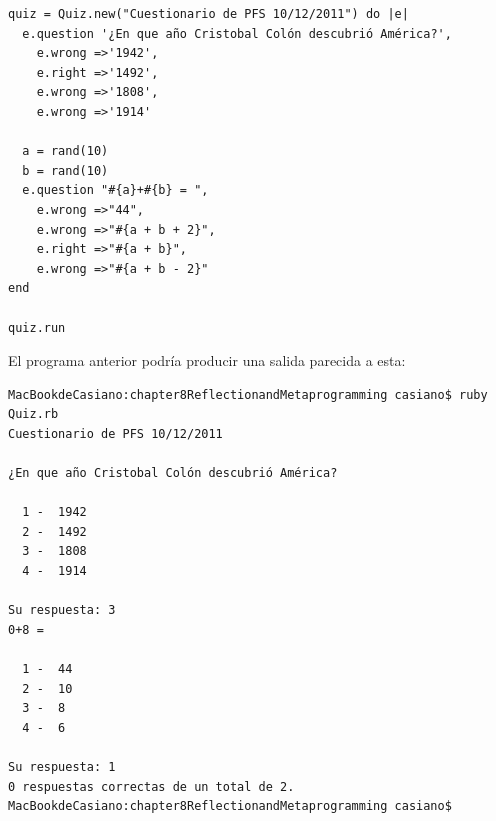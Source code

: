 \begin{verbatim}
quiz = Quiz.new("Cuestionario de PFS 10/12/2011") do |e|
  e.question '¿En que año Cristobal Colón descubrió América?',
    e.wrong =>'1942',
    e.right =>'1492',
    e.wrong =>'1808',
    e.wrong =>'1914'
  
  a = rand(10)
  b = rand(10)
  e.question "#{a}+#{b} = ",
    e.wrong =>"44",
    e.wrong =>"#{a + b + 2}",
    e.right =>"#{a + b}",
    e.wrong =>"#{a + b - 2}"
end

quiz.run
\end{verbatim}
El programa anterior podría producir una salida parecida a esta:

\begin{verbatim}
MacBookdeCasiano:chapter8ReflectionandMetaprogramming casiano$ ruby Quiz.rb 
Cuestionario de PFS 10/12/2011

¿En que año Cristobal Colón descubrió América?

  1 -  1942
  2 -  1492
  3 -  1808
  4 -  1914

Su respuesta: 3
0+8 = 

  1 -  44
  2 -  10
  3 -  8
  4 -  6

Su respuesta: 1
0 respuestas correctas de un total de 2.
MacBookdeCasiano:chapter8ReflectionandMetaprogramming casiano$ 
\end{verbatim}

